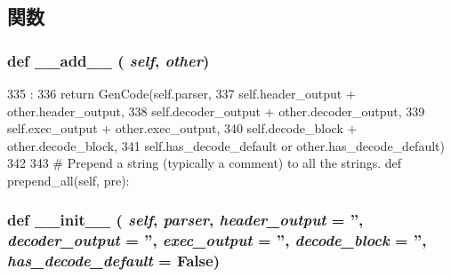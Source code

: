 \subsection{関数}
\hypertarget{classisa__parser_1_1GenCode_ae92943b217d29a45ddcbbba2f7208afc}{
\subsubsection[{\_\-\_\-add\_\-\_\-}]{\setlength{\rightskip}{0pt plus 5cm}def \_\-\_\-add\_\-\_\- ( {\em self}, \/   {\em other})}}
\label{classisa__parser_1_1GenCode_ae92943b217d29a45ddcbbba2f7208afc}



\begin{DoxyCode}
335                             :
336         return GenCode(self.parser,
337                        self.header_output + other.header_output,
338                        self.decoder_output + other.decoder_output,
339                        self.exec_output + other.exec_output,
340                        self.decode_block + other.decode_block,
341                        self.has_decode_default or other.has_decode_default)
342 
343     # Prepend a string (typically a comment) to all the strings.
    def prepend_all(self, pre):
\end{DoxyCode}
\hypertarget{classisa__parser_1_1GenCode_ac775ee34451fdfa742b318538164070e}{
\subsubsection[{\_\-\_\-init\_\-\_\-}]{\setlength{\rightskip}{0pt plus 5cm}def \_\-\_\-init\_\-\_\- ( {\em self}, \/   {\em parser}, \/   {\em header\_\-output} = {\ttfamily ''}, \/   {\em decoder\_\-output} = {\ttfamily ''}, \/   {\em exec\_\-output} = {\ttfamily ''}, \/   {\em decode\_\-block} = {\ttfamily ''}, \/   {\em has\_\-decode\_\-default} = {\ttfamily False})}}
\label{classisa__parser_1_1GenCode_ac775ee34451fdfa742b318538164070e}



